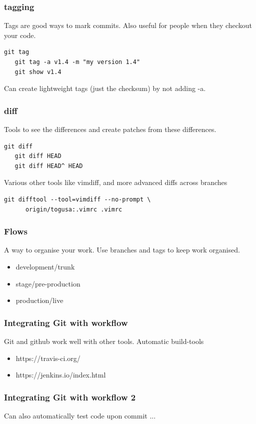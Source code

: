 \documentclass{beamer}
\begin{document}

\begin{frame}[fragile]
  \frametitle{tagging}
  Tags are good ways to mark commits. Also useful for people when they checkout your code. 

  \begin{lstlisting}[caption=tagging] 
   git tag
   git tag -a v1.4 -m "my version 1.4"
   git show v1.4
  \end{lstlisting}

  Can create lightweight tags (just the checksum) by not adding -a.

\end{frame}


\begin{frame}[fragile]
  \frametitle{diff}
  Tools to see the differences and create patches from these differences.

  \begin{lstlisting}[caption=diff examples] 
   git diff
   git diff HEAD
   git diff HEAD^ HEAD
  \end{lstlisting}

  Various other tools like vimdiff, and more advanced diffs across branches

  \begin{lstlisting}[caption=diff examples 2] 
    git difftool --tool=vimdiff --no-prompt \
      origin/togusa:.vimrc .vimrc
  \end{lstlisting}

\end{frame}


\begin{frame}
  \frametitle{Flows}
  A way to organise your work. Use branches and tags to keep work organised. 
 
  \begin{itemize}
    \item development/trunk
    \item stage/pre-production
    \item production/live
  \end{itemize}
 
\end{frame}


\begin{frame}
  \frametitle{Integrating Git with workflow}
  Git and github work well with other tools. Automatic build-tools  

  \begin{itemize} 
    \item https://travis-ci.org/
    \item https://jenkins.io/index.html
  \end{itemize}
 
\end{frame}


\begin{frame}
  \frametitle{Integrating Git with workflow 2}
  Can also automatically test code upon commit ... 

\end{frame}
\end{document}
